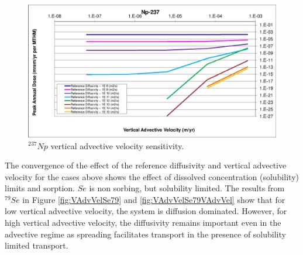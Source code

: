 \begin{figure}[htp!]
\begin{minipage}[b]{0.45\linewidth}
\includegraphics[width=\linewidth]{./chapters/nuclide_sensitivity/clay/AdvVelAndDiffCoeffEBSFail/Np-237-VAdvVel.eps}
\caption{$^{237}Np$ vertical advective velocity sensitivity.}
\label{fig:VAdvVelNp237VAdvVel}
  
\end{minipage}
\end{figure}

The convergence of the effect of the reference diffusivity and vertical 
advective velocity for the cases above shows the effect of dissolved 
concentration (solubility) limits and sorption. $Se$ is non sorbing, but 
solubility limited.  The results from $^{79}Se$ in Figure \ref{fig:VAdvVelSe79} 
and \ref{fig:VAdvVelSe79VAdvVel} show that for low vertical advective velocity, 
the system is diffusion dominated.  However, for high vertical advective 
velocity, the diffusivity remains important even in the advective regime as 
spreading facilitates transport in the presence of solubility limited transport. 

